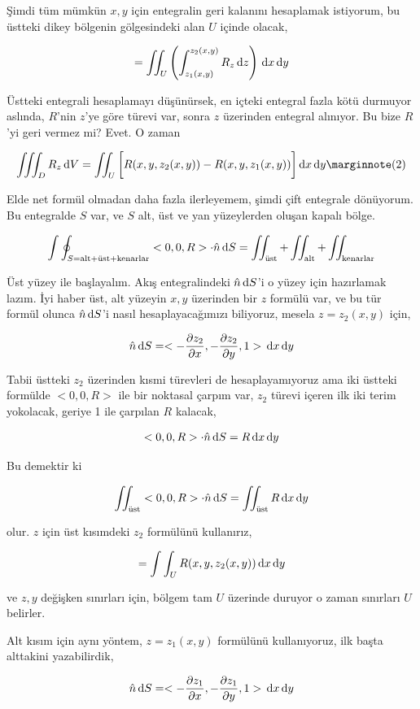 \documentclass[12pt,fleqn]{article}\usepackage{../../common}
\begin{document}
Şimdi tüm mümkün $x,y$ için entegralin geri kalanını hesaplamak istiyorum,
bu üstteki dikey bölgenin gölgesindeki alan $U$ içinde olacak, 

$$
= \iint_U \left( \int_{z_1(x,y)}^{z_2(x,y)} R_z \,\mathrm{d} z  \right) \,\mathrm{d} x \,\mathrm{d} y  
$$

Üstteki entegrali hesaplamayı düşünürsek, en içteki entegral fazla kötü durmuyor
aslında, $R$'nin $z$'ye göre türevi var, sonra $z$ üzerinden entegral alınıyor.
Bu bize $R$'yi geri vermez mi? Evet. O zaman

$$
\iiint_D R_z \ud V = \iint_U \bigg[ R(x,y,z_2(x,y)) - R(x,y,z_1(x,y))  \bigg]
\ud x \ud y
\mlabel{2}
$$

Elde net formül olmadan daha fazla ilerleyemem, şimdi çift entegrale dönüyorum.
Bu entegralde $S$ var, ve $S$ alt, üst ve yan yüzeylerden oluşan kapalı bölge.

$$
\int \oint_{S = \textrm{alt+üst+kenarlar}} < 0,0,R > \cdot \hat{n} \,\mathrm{d} S =
\iint_{\textrm{üst}} + \iint_{\textrm{alt}} + \iint_{\textrm{kenarlar}} 
$$

Üst yüzey ile başlayalım. Akış entegralindeki $\hat{n} \,\mathrm{d} S$'i o yüzey
için hazırlamak lazım. İyi haber üst, alt yüzeyin $x,y$ üzerinden bir $z$
formülü var, ve bu tür formül olunca $\hat{n} \,\mathrm{d} S$'i nasıl hesaplayacağımızı
biliyoruz, mesela $z=z_2(x,y)$ için,

$$
\hat{n} \,\mathrm{d} S =
< -\frac{\partial z_2}{\partial x},
-\frac{\partial z_2}{\partial y},
1 >
\,\mathrm{d} x \,\mathrm{d} y
$$

Tabii üstteki $z_2$ üzerinden kısmi türevleri de hesaplayamıyoruz ama
iki üstteki formülde $< 0,0,R >$ ile bir noktasal çarpım var, $z_2$
türevi içeren ilk iki terim yokolacak, geriye 1 ile çarpılan $R$
kalacak,

$$
< 0,0,R > \cdot \hat{n} \,\mathrm{d} S = R \,\mathrm{d} x \,\mathrm{d} y
$$

Bu demektir ki 

$$
\iint_{\textrm{üst}} < 0,0,R > \cdot \hat{n} \,\mathrm{d} S =
\iint_{\textrm{üst}} R \,\mathrm{d} x \,\mathrm{d} y
$$

olur. $z$ için üst kısımdeki $z_2$ formülünü kullanırız,

$$
= \int \int_U R(x,y,z_2(x,y)) \,\mathrm{d} x \,\mathrm{d} y
$$

ve $z,y$ değişken sınırları için, bölgem tam $U$ üzerinde duruyor o zaman
sınırları $U$ belirler.

Alt kısım için aynı yöntem, $z = z_1(x,y)$ formülünü kullanıyoruz, ilk başta
alttakini yazabilirdik,

$$
\hat{n} \,\mathrm{d} S =
< -\frac{\partial z_1}{\partial x},
-\frac{\partial z_1}{\partial y},
1 >
\,\mathrm{d} x \,\mathrm{d} y
$$
\end{document}

